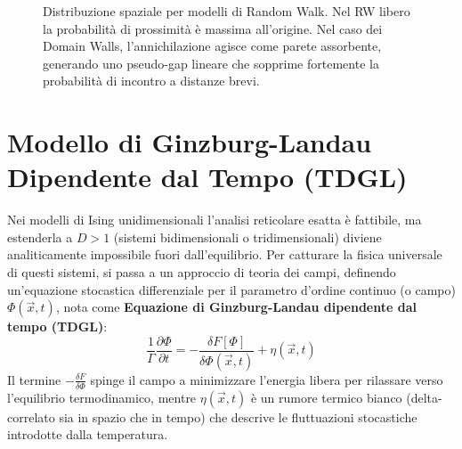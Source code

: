 \vspace{0.5cm}

\begin{figure}[H]
\centering
{}
\caption{Distribuzione spaziale per modelli di Random Walk. Nel RW libero la probabilità di prossimità è massima all'origine. Nel caso dei Domain Walls, l'annichilazione agisce come parete assorbente, generando uno pseudo-gap lineare che sopprime fortemente la probabilità di incontro a distanze brevi.}
\end{figure}

\newpage
\section{Modello di Ginzburg-Landau Dipendente dal Tempo (TDGL)}

Nei modelli di Ising unidimensionali l'analisi reticolare esatta è fattibile, ma estenderla a $D > 1$ (sistemi bidimensionali o tridimensionali) diviene analiticamente impossibile fuori dall'equilibrio.
Per catturare la fisica universale di questi sistemi, si passa a un approccio di teoria dei campi, definendo un'equazione stocastica differenziale per il parametro d'ordine continuo (o campo) $\Phi(\vec{x}, t)$, nota come \textbf{Equazione di Ginzburg-Landau dipendente dal tempo (TDGL)}:
\begin{equation}
    \frac{1}{\Gamma} \frac{\partial \Phi}{\partial t} = -\frac{\delta F[\Phi]}{\delta \Phi(\vec{x}, t)} + \eta(\vec{x}, t)
\end{equation}
Il termine $-\frac{\delta F}{\delta \Phi}$ spinge il campo a minimizzare l'energia libera per rilassare verso l'equilibrio termodinamico, mentre $\eta(\vec{x}, t)$ è un rumore termico bianco (delta-correlato sia in spazio che in tempo) che descrive le fluttuazioni stocastiche introdotte dalla temperatura.

